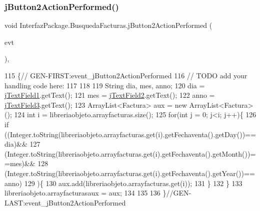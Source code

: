 \mbox{\label{class_interfaz_package_1_1_busqueda_facturas_a2f1ef5a0573d3c0079b0c2ec4c1425f9}} 
\subsubsection{\texorpdfstring{j\+Button2\+Action\+Performed()}{jButton2ActionPerformed()}}
{\footnotesize\ttfamily void Interfaz\+Package.\+Busqueda\+Facturas.\+j\+Button2\+Action\+Performed (\begin{DoxyParamCaption}\item[{java.\+awt.\+event.\+Action\+Event}]{evt }\end{DoxyParamCaption})\hspace{0.3cm}{\ttfamily [inline]}, {\ttfamily [private]}}


\begin{DoxyCode}
115                                                                          \{\textcolor{comment}{//
      GEN-FIRST:event\_jButton2ActionPerformed}
116         \textcolor{comment}{// TODO add your handling code here:}
117         
118         
119         String dia, mes, anno;
120         dia = \mbox{\hyperlink{class_interfaz_package_1_1_busqueda_facturas_ac7cfc9bbf0501c53bb3014890e92efc2}{jTextField1}}.getText();
121         mes = \mbox{\hyperlink{class_interfaz_package_1_1_busqueda_facturas_a3bc720241bb5aea5badbbc7937d79292}{jTextField2}}.getText();
122         anno = \mbox{\hyperlink{class_interfaz_package_1_1_busqueda_facturas_aadd306dde44841b9ab43c6753b3df0d7}{jTextField3}}.getText();
123         ArrayList<Factura> aux = \textcolor{keyword}{new} ArrayList<Factura>();
124          \textcolor{keywordtype}{int} i = libreriaobjeto.arrayfacturas.size();
125          \textcolor{keywordflow}{for}(\textcolor{keywordtype}{int} j = 0; j<i; j++)\{
126              \textcolor{keywordflow}{if} ((Integer.toString(libreriaobjeto.arrayfacturas.get(i).getFechaventa().getDay())==dia)&&
127                  (Integer.toString(libreriaobjeto.arrayfacturas.get(i).getFechaventa().getMonth())==mes)&&
128                  (Integer.toString(libreriaobjeto.arrayfacturas.get(i).getFechaventa().getYear())==anno)
129                 )\{
130                  aux.add(libreriaobjeto.arrayfacturas.get(i));
131              \}
132          \}
133          libreriaobjeto.arrayfacturasaux = aux;
134         
135         
136     \}\textcolor{comment}{//GEN-LAST:event\_jButton2ActionPerformed}
\end{DoxyCode}
\mbox{\label{class_interfaz_package_1_1_busqueda_facturas_a82603c4df5b4715daf0085c622e48d08}} 
